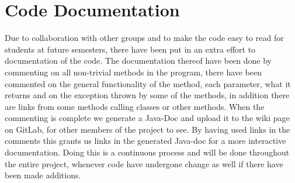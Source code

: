 \section{Code Documentation} \label{sec:code_documentation}
Due to collaboration with other groups and to make the code easy to read for students at future semesters, there have been put in an extra effort to documentation of the code. The documentation thereof have been done by commenting on all non-trivial methods in the program, there have been commented on the general functionality of the method, each parameter, what it returns and on the exception thrown by some of the methods, in addition there are links from some methods calling classes or other methods. When the commenting is complete we generate a Java-Doc and upload it to the wiki page on GitLab, for other members of the project to see. By having used links in the comments this grants us links in the generated Java-doc for a more interactive documentation. 
Doing this is a continuous process and will be done throughout the entire project, whenever code have undergone change as well if there have been made additions.